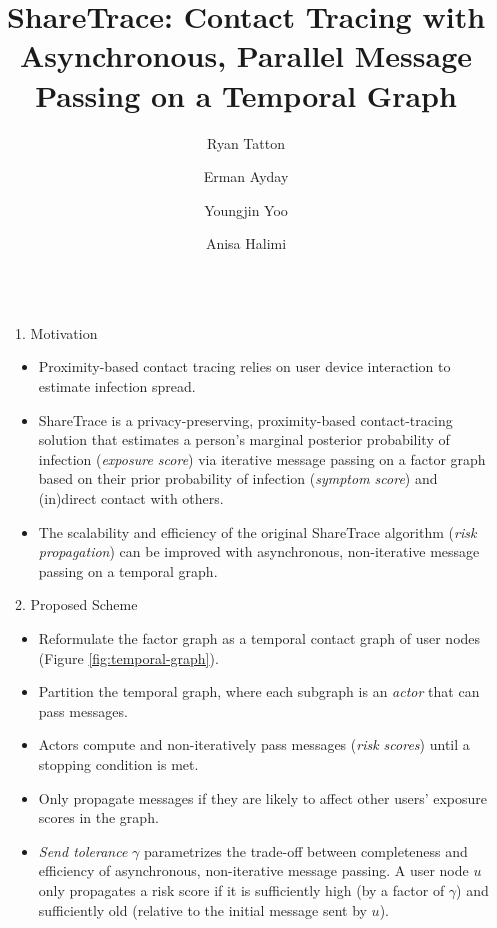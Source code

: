 \documentclass[final]{beamer}
\title{ShareTrace: Contact Tracing with Asynchronous, Parallel Message Passing on a Temporal Graph}
\author{Ryan Tatton \and Erman Ayday \and Youngjin Yoo \and Anisa Halimi}
\institute[shortinst]{Case Western Restern Reserve University}
\newlength{\sepwidth}
\newlength{\colwidth}
\newcommand{\separatorcolumn}{\begin{column}{\sepwidth}\end{column}}
\begin{document}
\begin{frame}[t]
\begin{columns}[t]
\separatorcolumn
\begin{column}{\colwidth}
	\begin{block}{1. Motivation}
		\begin{itemize}
			\item Proximity-based contact tracing relies on user device interaction to estimate infection spread.
			\item ShareTrace is a privacy-preserving, proximity-based contact-tracing solution that estimates a person's marginal posterior probability of infection (\emph{exposure score}) via iterative message passing on a factor graph based on their prior probability of infection (\emph{symptom score}) and (in)direct contact with others.
			\item The scalability and efficiency of the original ShareTrace algorithm (\emph{risk propagation}) \cite{Ayday2021} can be improved with asynchronous, non-iterative message passing on a temporal graph.
		\end{itemize}
	\end{block}
	\begin{block}{2. Proposed Scheme}
		\begin{itemize}
			\item Reformulate the factor graph as a temporal contact graph of user nodes (Figure \ref{fig:temporal-graph}).
			\item Partition the temporal graph, where each subgraph is an \emph{actor} \cite{Agha1986} that can pass messages.
			\item Actors compute and non-iteratively pass messages (\emph{risk scores}) until a stopping condition is met.
			\item Only propagate messages if they are likely to affect other users' exposure scores in the graph.
			\item \emph{Send tolerance} $\gamma$ parametrizes the trade-off between completeness and efficiency of asynchronous, non-iterative message passing. A user node $u$ only propagates a risk score if it is sufficiently high (by a factor of $\gamma$) and sufficiently old (relative to the initial message sent by $u$).
		\end{itemize}
		\begin{figure}
			\centering
\end{figure}
\end{block}
\end{column}
\end{columns}
\end{frame}
\end{document}
